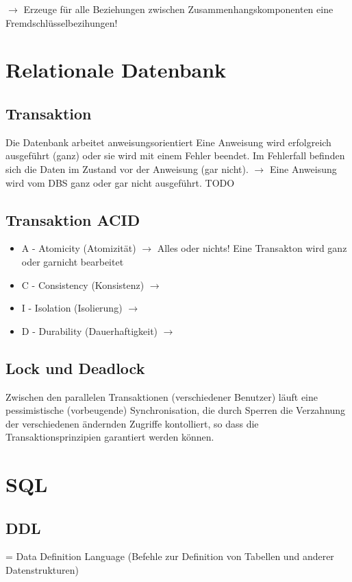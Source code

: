 \documentclass[a4paper,10pt]{scrartcl}
\begin{document}
$\rightarrow$ Erzeuge für alle Beziehungen zwischen Zusammenhangskomponenten eine Fremdschlüsselbezihungen!
\newpage
\section{Relationale Datenbank}
\subsection{Transaktion}
Die Datenbank arbeitet anweisungsorientiert 
Eine Anweisung wird erfolgreich ausgeführt (ganz) oder sie wird mit einem Fehler beendet. Im Fehlerfall befinden sich die Daten im Zustand vor der Anweisung (gar nicht). \newline
$\rightarrow$ Eine Anweisung wird vom DBS ganz oder gar nicht ausgeführt.
TODO
\subsection{Transaktion ACID}
\begin{itemize}
    \item A - Atomicity (Atomizität) \newline
    $\rightarrow$ Alles oder nichts! Eine Transakton wird ganz oder garnicht bearbeitet
    \item C - Consistency (Konsistenz) \newline
    $\rightarrow$
    \item I - Isolation (Isolierung) \newline
    $\rightarrow$
    \item D - Durability (Dauerhaftigkeit) \newline
    $\rightarrow$
\end{itemize}
\subsection{Lock und Deadlock}
Zwischen den parallelen Transaktionen (verschiedener Benutzer) läuft eine pessimistische (vorbeugende) Synchronisation, die durch Sperren die Verzahnung der verschiedenen ändernden Zugriffe kontolliert, so dass die Transaktionsprinzipien garantiert werden können.
\newpage    
\section{SQL}
\subsection{DDL}
= Data Definition Language (Befehle zur Definition von Tabellen und anderer Datenstrukturen)
\end{document}
